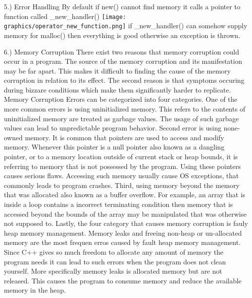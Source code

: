 \documentclass[letterpaper, 12pt]{article}
\begin{document}
5.) Error Handling
	By default if new() cannot find memory it calls a pointer to function called _new_handler()
	\texttt{[image: graphics/operator\_new\_function.png]}
	\cite{boostuse}
	if _new_handler() can somehow supply memory for malloc() then everything is good otherwise an exception is thrown.

6.) Memory Corruption
		There exist two reasons that memory corruption could occur in a program. The source of the memory corruption and its manifestation may be far apart. This makes it difficult to finding the cause of the memory corruption in relation to its effect. The second reason is that symptoms occuring during bizzare conditions which make them significantly harder to replicate. Memory Corruption Errors can be categorized into four categories. One of the more common errors is using uninitialized memory. This refers to the contents of uninitialized memory are treated as garbage values. The usage of such garbage values can lead to unpredictable program behavior. Second error is using none-owned memory. It is common that pointers are used to access and modify memory. Whenever this pointer is a null pointer also known as a dangling pointer, or to a memory location outside of current stack or heap bounds, it is referring to memory that is not possessed by the program. Using these pointers causes serious flaws. Accessing such memory usually cause OS exceptions, that commonly leads to program crashes. Third, using memory beyond the memory that was allocated also known as a buffer overflow. For example, an array that is inside a loop contains a incorrect terminating condition then memory that is accessed beyond the bounds of the array may be manipulated that was otherwise not supposed to. Lastly, the four category that causes memory corruption is fauly heap memory management. Memory leaks and freeing non-heap or un-allocated memory are the most frequen erros caused by fault heap memory management. Since C++ gives so much freedom to allocate any amount of memory the program needs it can lead to such errors when the program does not clean yourself. More specifically memory leaks is allocated memory but are not released. This causes the program to consume memory and reduce the available memory in the heap.
	
\end{document}
